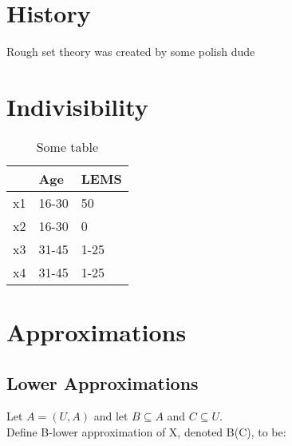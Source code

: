 \section{History}
Rough set theory was created by some polish dude

\section{Indivisibility }
\begin{table}
\centering
\begin{tabular}{|l | l | l |}
\toprule
 & Age & LEMS\\
 \midrule
x1 & 16-30 & 50\\
x2 & 16-30 &0\\
x3 & 31-45& 1-25\\
x4 & 31-45 & 1-25\\

\bottomrule
\end{tabular}
\caption{Some table}
\end{table}

\section{Approximations}

\subsection{Lower Approximations}
Let $A = (U, A)$ and let $B\subseteq A$ and $C \subseteq U $. \\
Define B-lower approximation of X, denoted B(C), to be:
